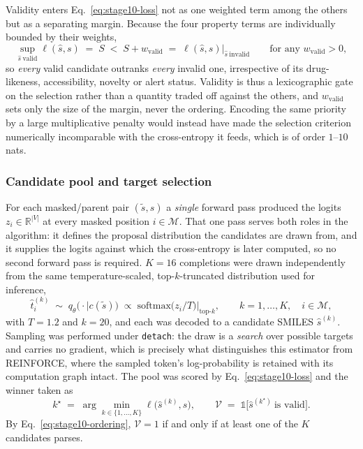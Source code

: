 \documentclass[a4paper,12pt]{article}
\begin{document}
Validity enters Eq.~\eqref{eq:stage10-loss} not as one weighted term among the
others but as a separating margin. Because the four property terms are
individually bounded by their weights,
\begin{equation}
\sup_{\hat{s}\ \mathrm{valid}} \ell(\hat{s},s) \;=\; S
\;<\; S + w_{\mathrm{valid}} \;=\; \ell(\hat{s},s)\big|_{\hat{s}\ \mathrm{invalid}}
\qquad \text{for any } w_{\mathrm{valid}}>0 ,
\label{eq:stage10-ordering}
\end{equation}
so \emph{every} valid candidate outranks \emph{every} invalid one, irrespective
of its drug-likeness, accessibility, novelty or alert status. Validity is thus a
lexicographic gate on the selection rather than a quantity traded off against
the others, and $w_{\mathrm{valid}}$ sets only the size of the margin, never the
ordering. Encoding the same priority by a large multiplicative penalty would
instead have made the selection criterion numerically incomparable with the
cross-entropy it feeds, which is of order $1$--$10$ nats.

\subsubsection{Candidate pool and target selection}

For each masked/parent pair $(\tilde{s}, s)$ a \emph{single} forward pass
produced the logits $z_i \in \mathbb{R}^{|V|}$ at every masked position $i \in
\mathcal{M}$. That one pass serves both roles in the algorithm: it defines the
proposal distribution the candidates are drawn from, and it supplies the logits
against which the cross-entropy is later computed, so no second forward pass is
required. $K=16$ completions were drawn independently from the same
temperature-scaled, top-$k$-truncated distribution used for inference,
\begin{equation}
\hat{t}^{(k)}_i \;\sim\; q_{\theta}\bigl(\cdot \mid c(\tilde{s})\bigr)
\;\propto\; \mathrm{softmax}\bigl(z_i / T\bigr)\Big|_{\mathrm{top}\text{-}k},
\qquad k = 1,\dots,K, \quad i \in \mathcal{M},
\label{eq:stage10-sampling}
\end{equation}
with $T=1.2$ and $k=20$, and each was decoded to a candidate SMILES
$\hat{s}^{(k)}$. Sampling was performed under \texttt{detach}: the draw is a
\emph{search} over possible targets and carries no gradient, which is precisely
what distinguishes this estimator from REINFORCE, where the sampled token's
log-probability is retained with its computation graph intact. The pool was
scored by Eq.~\eqref{eq:stage10-loss} and the winner taken as
\begin{equation}
k^{\star} \;=\; \arg\min_{k \in \{1,\dots,K\}} \ell\bigl(\hat{s}^{(k)}, s\bigr),
\qquad
\mathcal{V} \;=\; \mathbb{1}\bigl[\hat{s}^{(k^{\star})}\ \text{is valid}\bigr].
\label{eq:stage10-argmin}
\end{equation}
By Eq.~\eqref{eq:stage10-ordering}, $\mathcal{V}=1$ if and only if at least one
of the $K$ candidates parses.
\end{document}
